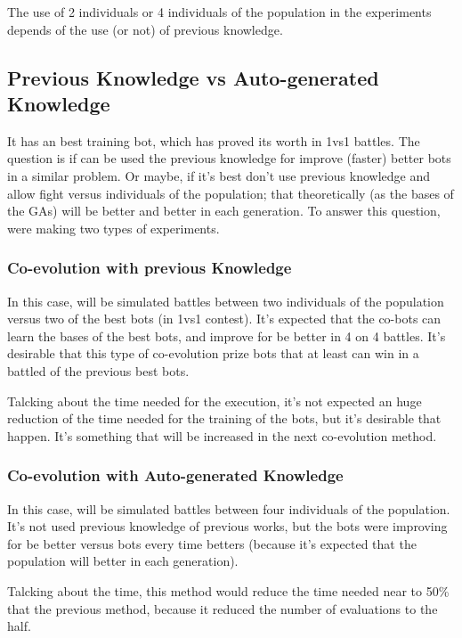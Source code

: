 \documentclass{llncs}
\begin{document}
The use of 2 individuals or 4 individuals of the population in the experiments depends of the use (or not) of previous knowledge. 

\subsection{Previous Knowledge vs Auto-generated Knowledge}
\label{sec:knowledge}

It has an best training bot, which has proved its worth in 1vs1 battles. The question is if can be used the previous knowledge for improve (faster) better bots in a similar problem. Or maybe, if it's best don't use previous knowledge and allow fight versus individuals of the population; that theoretically (as the bases of the GAs) will be better and better in each generation. To answer this question, were making two types of experiments.

\subsubsection{Co-evolution with previous Knowledge}
\label{sec:knowledge:previous}

In this case, will be simulated battles between two individuals of the population versus two of the best bots (in 1vs1 contest). It's expected that the co-bots can learn the bases of the best bots, and improve for be better in 4 on 4 battles. It's desirable that this type of co-evolution prize bots that at least can win in a battled of the previous best bots.

Talcking about the time needed for the execution, it's not expected an huge reduction of the time needed for the training of the bots, but it's desirable that happen. It's something that will be increased in the next co-evolution method.

\subsubsection{Co-evolution with Auto-generated Knowledge}
In this case, will be simulated battles between four individuals of the population. It's not used previous knowledge of previous works, but the bots were improving for be better versus bots every time betters (because it's expected that the population will better in each generation).

Talcking about the time, this method would reduce the time needed near to 50\% that the previous method, because it reduced the number of evaluations to the half.
\end{document}
